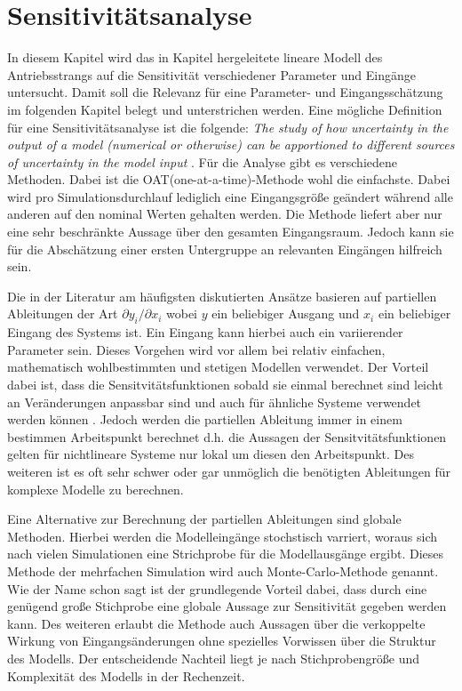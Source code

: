 \chapter{Sensitivitätsanalyse}\label{ch:Sensitivity}\label{ch:ch3}
In diesem Kapitel wird das in Kapitel \cite{ch:ch3} hergeleitete lineare Modell des Antriebsstrangs auf die Sensitivität verschiedener Parameter und Eingänge untersucht. Damit soll die Relevanz für eine Parameter- und Eingangsschätzung im folgenden Kapitel belegt und unterstrichen werden.
Eine mögliche Definition für eine Sensitivitätsanalyse ist die folgende: \emph{The study of how uncertainty in the output of a model (numerical or otherwise) can be apportioned to different sources of uncertainty in the model input} \cite{Saltelli.2004}.
Für die Analyse gibt es verschiedene Methoden. Dabei ist die OAT(one-at-a-time)-Methode wohl die einfachste. Dabei wird pro Simulationsdurchlauf lediglich eine Eingangsgröße geändert während alle anderen auf den nominal Werten gehalten werden. Die Methode liefert aber nur eine sehr beschränkte Aussage über den gesamten Eingangsraum. Jedoch kann sie für die Abschätzung einer ersten Untergruppe an relevanten Eingängen hilfreich sein.    

 Die in der Literatur am häufigsten diskutierten Ansätze basieren auf partiellen Ableitungen der Art $\partial y_i/\partial x_i$ wobei $y$ ein beliebiger Ausgang und $x_i$ ein beliebiger Eingang des Systems ist. Ein Eingang kann hierbei auch ein variierender Parameter sein. Dieses Vorgehen wird vor allem bei relativ einfachen, mathematisch wohlbestimmten und stetigen Modellen verwendet. Der Vorteil dabei ist, dass die Sensitvitätsfunktionen sobald sie einmal berechnet sind leicht an Veränderungen anpassbar sind und auch für ähnliche Systeme verwendet werden können \cite{Karnavas.1993}. Jedoch werden die partiellen Ableitung immer in einem bestimmen Arbeitspunkt berechnet d.h. die Aussagen der Sensitvitätsfunktionen gelten für nichtlineare Systeme nur lokal um diesen den Arbeitspunkt. Des weiteren ist es oft sehr schwer oder gar unmöglich die benötigten Ableitungen für komplexe Modelle zu berechnen.

Eine Alternative zur Berechnung der partiellen Ableitungen sind globale Methoden. Hierbei werden die Modelleingänge stochstisch varriert, woraus sich nach vielen Simulationen eine Strichprobe für die Modellausgänge ergibt. Dieses Methode der mehrfachen Simulation wird auch Monte-Carlo-Methode genannt. Wie der Name schon sagt ist der grundlegende Vorteil dabei, dass durch eine genügend große Stichprobe eine globale Aussage zur Sensitivität gegeben werden kann. Des weiteren erlaubt die Methode auch Aussagen über die verkoppelte Wirkung von Eingangsänderungen ohne spezielles Vorwissen über die Struktur des Modells. Der entscheidende Nachteil liegt je nach Stichprobengröße und Komplexität des Modells in der Rechenzeit.      

